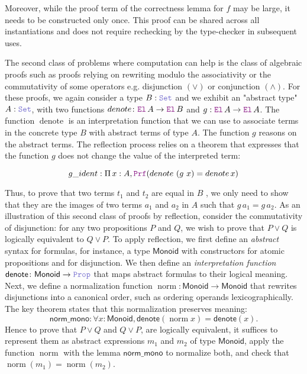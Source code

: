 Moreover, while the proof term of the correctness lemma for $f$ may be large, it needs to be constructed only once. This proof can be shared across all instantiations and does not require rechecking by the type-checker in subsequent uses.

\medskip

The second class of problems where computation can help is the class of algebraic proofs such as proofs relying on rewriting modulo the associativity or the commutativity of some operators e.g. disjunction $(\lor)$ or conjunction $(\land)$.
For these proofs, we again consider a type $B: \set$ and we exhibit an "abstract type" $A: \set$, with two functions $\mathop{denote} \colon {\el}\,A \ra {\el}\,B$ and $g: \el{}\,A \ra \el{}\,A$.
The function $\mathop{denote}$ is an interpretation function that we can use to associate terms in the concrete type $B$ with abstract terms of type $A$.
The function $g$ reasons on the abstract terms. The reflection process relies on a theorem that expresses that the function $g$ does not change the value of the interpreted
term:

\begin{equation*}
  g\_ident : \Pi\,x: A, \prf (\mathop{denote}~(g~x) = \mathop{denote} x)
\end{equation*}

Thus, to prove that two terms $t_1$ and $t_2$ are equal in $B$ , we only need to show that they are the images of two terms $a_1$ and $a_2$ in $A$ such that $g\,a_1 = g\,a_2$.
As an illustration of this second class of proofs by reflection, consider the commutativity of disjunction: for any two propositions $P$ and $Q$, we wish to prove that $P \lor Q$ is logically equivalent to $Q \lor P$.
To apply reflection, we first define an \emph{abstract} syntax for formulas, for instance, a type $\mathsf{Monoid}$ with constructors for atomic propositions and for disjunction.
We then define an \emph{interpretation function} $\mathsf{denote} \colon \mathsf{Monoid} \to \prop$ that maps abstract formulas to their logical meaning.
Next, we define a normalization function $\mathop{norm}: \mathsf{Monoid} \to \mathsf{Monoid}$ that rewrites disjunctions into a canonical order, such as ordering operands lexicographically.
The key theorem states that this normalization preserves meaning:
\[
\mathsf{norm\_mono} : \forall x : \mathsf{Monoid}, \mathsf{denote}(\mathop{norm} x) = \mathsf{denote}(x).
\]
Hence to prove that $P \lor Q$ and $Q \lor P$, are logically equivalent, it suffices to represent them as abstract expressions $m_1$ and $m_2$ of type $\mathsf{Monoid}$, apply the function $\mathop{norm}$ with the lemma $\mathsf{norm\_mono}$ to normalize both, and check that $\mathop{norm}(m_1) = \mathop{norm}(m_2)$.

